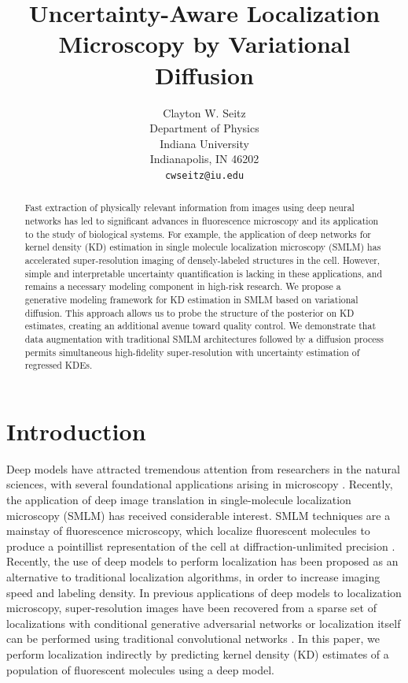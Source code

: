 \documentclass{article}
\title{Uncertainty-Aware Localization Microscopy by Variational Diffusion}
\author{%
  Clayton W. Seitz\\
  Department of Physics\\
  Indiana University\\
  Indianapolis, IN 46202 \\
  \texttt{cwseitz@iu.edu} \\
}
\begin{document}
\maketitle


\begin{abstract}

Fast extraction of physically relevant information from images using deep neural networks has led to significant advances in fluorescence microscopy and its application to the study of biological systems. For example, the application of deep networks for kernel density (KD) estimation in single molecule localization microscopy (SMLM) has accelerated super-resolution imaging of densely-labeled structures in the cell. However, simple and interpretable uncertainty quantification is lacking in these applications, and remains a necessary modeling component in high-risk research. We propose a generative modeling framework for KD estimation in SMLM based on variational diffusion. This approach allows us to probe the structure of the posterior on KD estimates, creating an additional avenue toward quality control. We demonstrate that data augmentation with traditional SMLM architectures followed by a diffusion process permits simultaneous high-fidelity super-resolution with uncertainty estimation of regressed KDEs. 
\end{abstract}

\section{Introduction}

Deep models have attracted tremendous attention from researchers in the natural sciences, with several foundational applications arising in microscopy \citep{Weigert2018,Falk2019}. Recently, the application of deep image translation in single-molecule localization microscopy (SMLM) has received considerable interest. SMLM techniques are a mainstay of fluorescence microscopy, which localize fluorescent molecules to produce a pointillist representation of the cell at diffraction-unlimited precision \citep{Rust2006,Betzig2006}. Recently, the use of deep models to perform localization has been proposed as an alternative to traditional localization algorithms, in order to increase imaging speed and labeling density. In previous applications of deep models to localization microscopy, super-resolution images have been recovered from a sparse set of localizations with conditional generative adversarial networks \citep{Ouyang2018} or localization itself can be performed using traditional convolutional networks \citep{Nehme2020,Speiser2021}. In this paper, we perform localization indirectly by predicting kernel density (KD) estimates of a population of fluorescent molecules using a deep model. 
\end{document}

